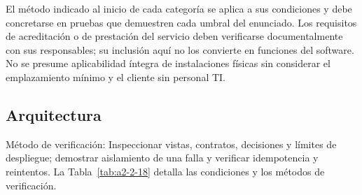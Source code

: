 El método indicado al inicio de cada categoría se aplica a sus condiciones
y debe concretarse en pruebas que demuestren cada umbral del enunciado.
Los requisitos de acreditación o de prestación del servicio deben verificarse
documentalmente con sus responsables; su inclusión aquí no los convierte en
funciones del software. No se presume aplicabilidad íntegra de instalaciones
físicas sin considerar el emplazamiento mínimo y el cliente sin personal TI.
\subsection*{Arquitectura}
Método de verificación: Inspeccionar vistas, contratos, decisiones y límites de despliegue; demostrar aislamiento de una falla y verificar idempotencia y reintentos.
La Tabla~\ref{tab:a2-2-18} detalla las condiciones y los métodos de verificación.
\setlength{\AnchoTablaAnexo}{\dimexpr\linewidth-6\tabcolsep-4\arrayrulewidth\relax}
